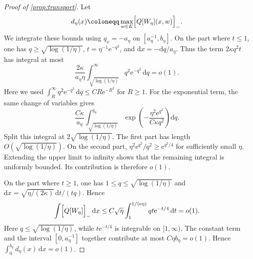 \documentclass[11pt,a4paper]{article}
\begin{document}
\begin{proof}[Proof of \cref{prop:transport}]
		Let
		\[
			d_\eta(x)\coloneqq
			\max_{w\in E}\Bigl[Q[W_\eta](x,w)\Bigr]_-.
		\]
		We integrate these bounds using $q_x=-a_\eta$ on
		$[a_\eta^{-1},b_\eta]$.  On the part where $t\le1$, one has
		$q\ge\sqrt{\log(1/\eta)}$, $t=\eta^{-1}\mathrm{e}^{-q^2}$, and
		$\mathrm{d}x=-\mathrm{d}q/a_\eta$.  Thus the term $2\kappa q^2t$
		has integral at most
		\[
			\frac{2\kappa}{a_\eta\eta}
			\int_{\sqrt{\log(1/\eta)}}^\infty
			q^2\mathrm{e}^{-q^2}\,\mathrm{d}q
			=o(1).
		\]
		Here we used
		$\int_R^\infty q^2\mathrm{e}^{-q^2}\,\mathrm{d}q
		\le CR\mathrm{e}^{-R^2}$ for $R\ge1$.
		For the exponential term, the same change of variables gives
		\[
			\frac{C\kappa}{a_\eta}
			\int_{\sqrt{\log(1/\eta)}}^{q_0}
			\exp\left(-\frac{\eta^2\mathrm{e}^{q^2}}
			{C\kappa q^2}\right)\mathrm{d}q.
		\]
		Split this integral at $2\sqrt{\log(1/\eta)}$.  The first part has
		length $O(\sqrt{\log(1/\eta)})$.  On the second part,
		$\eta^2\mathrm{e}^{q^2}/q^2\ge\mathrm{e}^{q^2/4}$ for sufficiently
		small $\eta$.  Extending the upper limit to infinity shows that the
		remaining integral is uniformly bounded.
		Its contribution is therefore $o(1)$.

		On the part where $t\ge1$, one has
		$1\le q\le\sqrt{\log(1/\eta)}$ and
		$\mathrm{d}x=\sqrt{\eta/(2\kappa)}\,\mathrm{d}t/(tq)$.  Hence
		\[
			\int \Bigl[Q[W_\eta]\Bigr]_-\,\mathrm{d}x
			\le C\sqrt\eta
			\int_1^{1/(\mathrm{e}\eta)}
			q t\mathrm{e}^{-t/4}\,\mathrm{d}t
			=o(1).
		\]
		Here $q\le\sqrt{\log(1/\eta)}$, while
		$t\mathrm{e}^{-t/4}$ is integrable on $[1,\infty)$.
		The constant term and the interval $[0,a_\eta^{-1}]$ together
		contribute at most $C\eta b_\eta=o(1)$.  Hence
		$\int_0^{b_\eta}d_\eta(x)\,\mathrm{d}x=o(1)$.


\end{proof}
\end{document}
